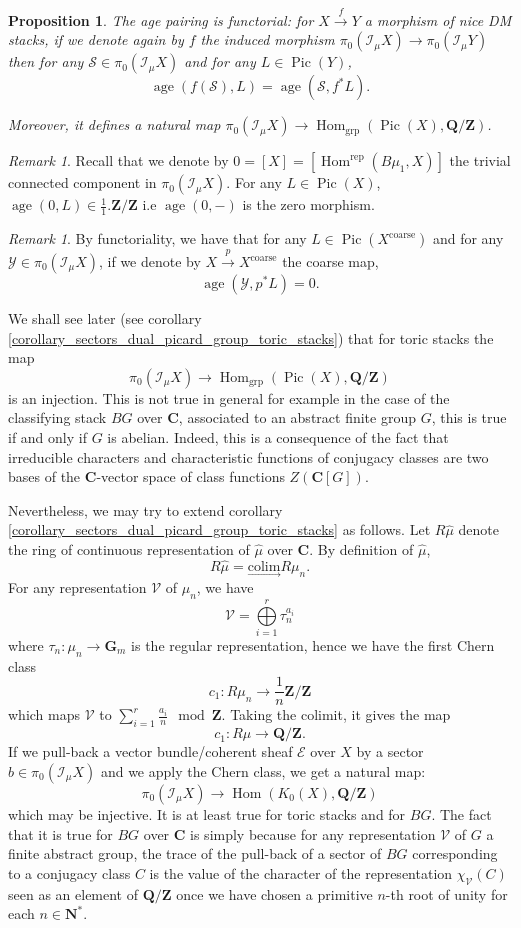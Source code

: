 \documentclass{proc-l}
\newcommand{\C}{\mathbf{C}}
\newcommand{\Z}{\mathbf{Z}}
\newcommand{\N}{\mathbf{N}}
\newcommand{\Q}{\mathbf{Q}}
\newcommand{\G}{\mathbf{G}}
\DeclareMathOperator{\Pic}{Pic}
\DeclareMathOperator{\grp}{grp}
\DeclareMathOperator{\Hom}{Hom}
\DeclareMathOperator{\age}{age}
\DeclareMathOperator{\coarse}{coarse}
\DeclareMathOperator{\rep}{rep}
\newcommand{\stackY}{\mathcal{Y}}
\newcommand{\stackS}{\mathcal{S}}
\newcommand{\sheafE}{\mathcal{E}}
\newcommand{\sheafI}{\mathcal{I}}
\newcommand{\sector}{\pi_0(\sheafI_{\mu} X)}
\newtheorem{prop}[theorem]{Proposition}
\theoremstyle{definition}
\theoremstyle{remark}
\newtheorem{remark}[theorem]{Remark}
\numberwithin{equation}{section}
\begin{document}
\begin{prop}\label{proposition_age_pairing_morphism_functoriality}
   The age pairing is functorial: for $X \xrightarrow{f} Y$ a morphism of nice DM stacks, if we denote again by $f$ the induced morphism $\sector \rightarrow \pi_0(\sheafI_{\mu} Y)  $ then for any $\stackS \in \sector$ and for any $L \in \Pic(Y)$, $$\age(f(\stackS),L) = \age(\stackS,f^* L) .$$
   
   Moreover, it defines a natural map $\sector \rightarrow \Hom_{\grp}(\Pic(X),\Q/\Z)$.
\end{prop}

\begin{remark}
    Recall that we denote by $0 = [X] = [ \Hom^{\rep}(B \mu_{1},X) ]$ the trivial connected component in $\sector$. For any $L \in \Pic(X)$, $\age(0,L) \in \frac{1}{1}. \Z / \Z$ i.e $\age(0,-)$ is the zero morphism.
\end{remark}

\begin{remark}
    By functoriality, we have that for any $L \in \Pic(X^{\coarse})$ and for any $\stackY \in \sector$, if we denote by $X \xrightarrow{p} X^{\coarse}$ the coarse map,  $$\age(\stackY,p^* L) = 0 .$$
\end{remark}

We shall see later (see corollary \ref{corollary_sectors_dual_picard_group_toric_stacks}) that for toric stacks the map $$\sector \rightarrow \Hom_{\grp}(\Pic(X),\Q/\Z)$$ is an injection. This is not true in general for example in the case of the classifying stack $B G$ over $\C$, associated to an abstract finite group $G$, this is true if and only if $G$ is abelian. Indeed, this is a consequence of the fact that irreducible characters and characteristic functions of conjugacy classes are two bases of the $\C$-vector space of class functions $Z( \C[G] )$. 

Nevertheless, we may try to extend corollary \ref{corollary_sectors_dual_picard_group_toric_stacks} as follows. Let $R \widehat{\mu}$ denote the ring of continuous representation of $\widehat{\mu}$ over $\C$. By definition of $\widehat{\mu}$,  $$R \widehat{\mu} = \underset{\rightarrow}{\text{colim}} R \mu_n .$$ For any representation $\mathcal{V}$ of $\mu_n$, we have $$\mathcal{V} = \bigoplus\limits_{i = 1}^r \tau_n^{a_i}$$where $\tau_n : \mu_n \rightarrow \G_m$ is the regular representation, hence we have the first Chern class $$c_1 : R \mu_n \rightarrow \frac{1}{n} \Z / \Z $$ which maps $\mathcal{V}$ to $\sum\limits_{i = 1}^r \frac{a_i}{n} \mod \Z.$ Taking the colimit, it gives the map $$c_1 : R \widehat{\mu} \rightarrow \Q / \Z .$$ If we pull-back a vector bundle/coherent sheaf $\sheafE$ over $X$ by a sector $b \in \sector$ and we apply the Chern class, we get a natural map:
$$\sector \rightarrow \Hom(K_0(X),\Q/\Z) $$which may be injective. It is at least true for toric stacks and for $B G$. The fact that it is true for $B G$ over $\C$ is simply because for any representation $\mathcal{V}$ of $G$ a finite abstract group, the trace of the pull-back of a sector of $B G$ corresponding to a conjugacy class $C$ is the value of the character of the representation $\chi_{\mathcal{V}}(C)$ seen as an element of $\Q / \Z$ once we have chosen a primitive $n$-th root of unity for each $n \in \N^*$.
\end{document}
